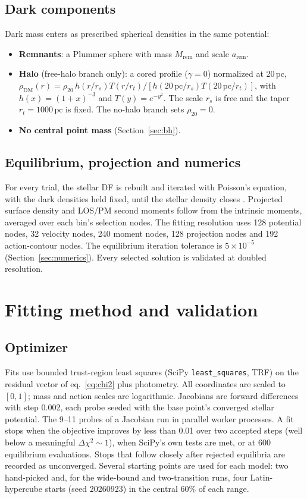 \documentclass[11pt,a4paper]{article}
\newcommand{\pc}{\ensuremath{\,\mathrm{pc}}\xspace}
\newcommand{\dm}{\mathrm{DM}}
\newcommand{\remn}{\mathrm{rem}}
\begin{document}
\subsection{Dark components}

Dark mass enters as prescribed spherical densities in the same potential:
\begin{itemize}
\item \textbf{Remnants}: a Plummer sphere with mass $M_\remn$ and scale $a_\remn$.
\item \textbf{Halo} (free-halo branch only): a cored profile ($\gamma=0$)
  normalized at 20\pc,
  $\rho_\dm(r)=\rho_{20}\,h(r/r_s)T(r/r_t)/[h(20\pc/r_s)T(20\pc/r_t)]$,
  with $h(x)=(1+x)^{-3}$ and $T(y)=e^{-y^2}$. The scale $r_s$ is free and the
  taper $r_t=1000\pc$ is fixed. The no-halo branch sets $\rho_{20}=0$.
\item \textbf{No central point mass} (Section~\ref{sec:bh}).
\end{itemize}

\subsection{Equilibrium, projection and numerics}

For every trial, the stellar DF is rebuilt and iterated with Poisson's
equation, with the dark densities held fixed, until the stellar density
closes \citep[AGAMA:][]{2019MNRAS.482.1525V}. Projected surface density and
LOS/PM second moments follow from the intrinsic moments, averaged over each
bin's selection nodes. The fitting resolution uses 128 potential nodes, 32
velocity nodes, 240 moment nodes, 128 projection nodes and 192 action-contour
nodes. The equilibrium iteration tolerance is $5\times10^{-5}$
(Section~\ref{sec:numerics}). Every selected solution is validated at doubled
resolution.

\section{Fitting method and validation}
\label{sec:method}

\subsection{Optimizer}

Fits use bounded trust-region least squares (SciPy \texttt{least\_squares},
TRF) on the residual vector of eq.~\eqref{eq:chi2} plus photometry. All
coordinates are scaled to $[0,1]$; mass and action scales are logarithmic.
Jacobians are forward differences with step 0.002, each probe seeded with the
base point's converged stellar potential. The 9--11 probes of a Jacobian run
in parallel worker processes. A fit stops when the objective improves by less
than 0.01 over two accepted steps (well below a meaningful
$\Delta\chi^2\sim1$), when SciPy's own tests are met, or at 600 equilibrium
evaluations. Stops that follow closely after rejected equilibria are recorded
as unconverged. Several starting points are used for each model: two
hand-picked and, for the wide-bound and two-transition runs, four
Latin-hypercube starts (seed 20260923) in the central 60\% of each range.
\end{document}
